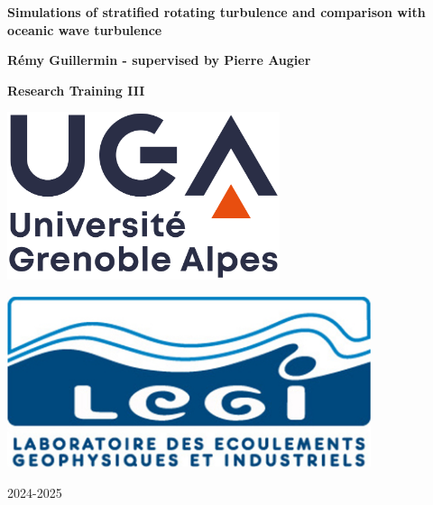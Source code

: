 \documentclass[11pt,twocolumn]{article}
\begin{document}
\pagestyle{fancy}
\fancyhf{}
\fancyhead[LE]{\nouppercase{\rightmark\hfill\leftmark}}
\fancyhead[RO]{\nouppercase{\leftmark\hfill\rightmark}}
\fancyfoot[C]{\thepage}

\begin{titlepage}
   \begin{center}
       \vspace*{1cm}
		
		\Huge
       \textbf{Simulations of stratified rotating turbulence and comparison with oceanic wave turbulence}
            
       \vspace{1.5cm}
       
       \LARGE
       \textbf{Rémy Guillermin - supervised by Pierre Augier}
       
       \vfill
       
       \Large
       \textbf{Research Training III}
            
       \vspace{0.8cm}
     	
       
       \begin{center}
    	\begin{minipage}{0.49\textwidth}
        \centering
        \includegraphics[width=0.6\textwidth]{UGA-logo}
    	\end{minipage}
    	\begin{minipage}{0.49\textwidth}
        \centering
        \includegraphics[width=0.8\textwidth]{LEGI-logo}
    	\end{minipage}
	    \end{center}
		
		\vspace{0.8cm}
		
       2024-2025
            
   \end{center}
\end{titlepage}
\end{document}
